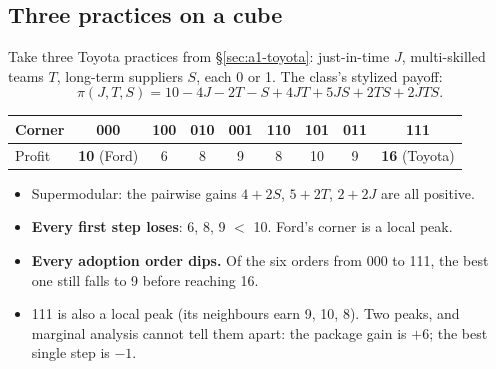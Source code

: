 \subsection{Three practices on a cube}\label{sec:a1-cube}

Take three Toyota practices from \S\ref{sec:a1-toyota}: just-in-time $J$, multi-skilled teams $T$,
long-term suppliers $S$, each 0 or 1. The class's stylized payoff:
\[
  \pi(J, T, S) = 10 - 4J - 2T - S + 4JT + 5JS + 2TS + 2JTS .
\]

\begin{center}
\small
\setlength{\tabcolsep}{4pt}
\begin{tabular}{@{}lcccccccc@{}}
\toprule
Corner & 000 & 100 & 010 & 001 & 110 & 101 & 011 & 111 \\
\midrule
Profit & \textbf{10} (Ford) & 6 & 8 & 9 & 8 & 10 & 9 & \textbf{16} (Toyota) \\
\bottomrule
\end{tabular}
\end{center}

\begin{itemize}
  \item Supermodular: the pairwise gains $4 + 2S$, $5 + 2T$, $2 + 2J$ are all positive.
  \item \textbf{Every first step loses}: 6, 8, 9 $<$ 10. Ford's corner is a local peak.
  \item \textbf{Every adoption order dips.} Of the six orders from 000 to 111, the best one still
    falls to 9 before reaching 16.
  \item 111 is also a local peak (its neighbours earn 9, 10, 8). Two peaks, and marginal analysis
    cannot tell them apart: the package gain is $+6$; the best single step is $-1$.
\end{itemize}

